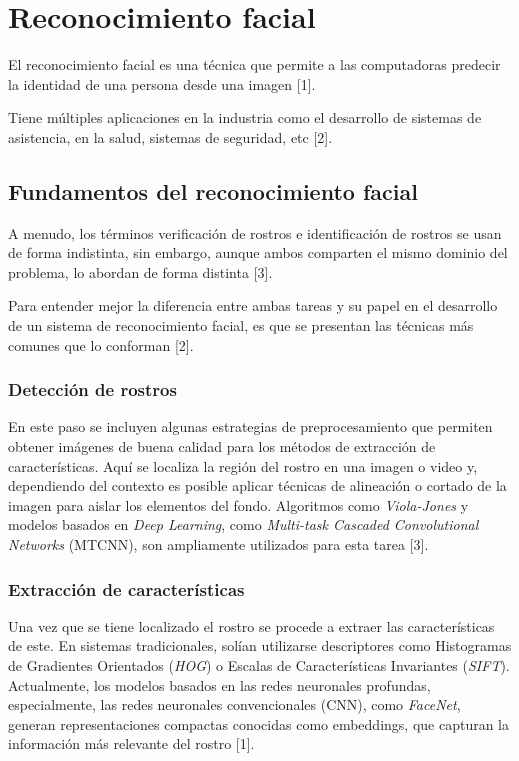 
\section{Reconocimiento facial}

El reconocimiento facial es una técnica que permite a las computadoras predecir la identidad de una persona desde una imagen [1].

Tiene múltiples aplicaciones en la industria como el desarrollo de sistemas de asistencia, en la salud, sistemas de seguridad, etc [2]. 

\subsection{Fundamentos del reconocimiento facial}

A menudo, los términos verificación de rostros e identificación de rostros se usan de forma indistinta, sin embargo, aunque ambos comparten el mismo dominio del problema, lo abordan de forma distinta [3].

Para entender mejor la diferencia entre ambas tareas y su papel en el desarrollo de un sistema de reconocimiento facial, es que se presentan las técnicas más comunes que lo conforman [2].

\subsubsection{Detección de rostros}

En este paso se incluyen algunas estrategias de preprocesamiento que permiten obtener imágenes de buena calidad para los métodos de extracción de características.
Aquí se localiza la región del rostro en una imagen o video y, dependiendo del contexto es posible aplicar técnicas de alineación o cortado de la imagen para aislar los elementos del fondo. Algoritmos como \textit{Viola-Jones} y modelos basados en \textit{Deep Learning}, como \textit{Multi-task Cascaded Convolutional Networks} (MTCNN), son ampliamente utilizados para esta tarea [3]. 

\subsubsection{Extracción de características}

Una vez que se tiene localizado el rostro se procede a extraer las características de este. En sistemas tradicionales, solían utilizarse descriptores como Histogramas de Gradientes Orientados (\textit{HOG}) o Escalas de Características Invariantes (\textit{SIFT}). Actualmente, los modelos basados en las redes neuronales profundas, especialmente, las redes neuronales convencionales (CNN), como \textit{FaceNet}, generan representaciones compactas conocidas como embeddings, que capturan la información más relevante del rostro [1].

